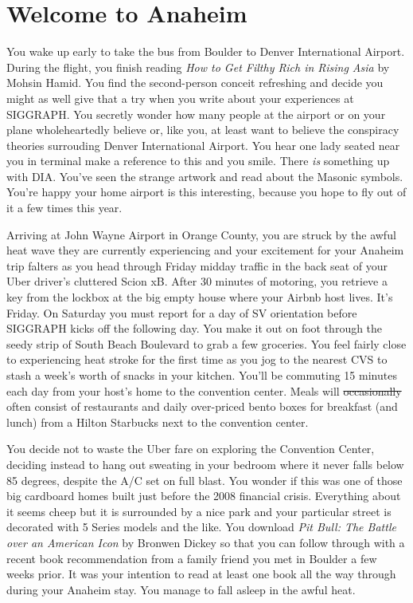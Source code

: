\documentclass[../main.tex]{subfiles}
\begin{document}
\section{Welcome to Anaheim}

You wake up early to take the bus from Boulder to Denver International Airport. During the flight, you finish reading \textit{How to Get Filthy Rich in Rising Asia} by Mohsin Hamid. You find the second-person conceit refreshing and decide you might as well give that a try when you write about your experiences at SIGGRAPH. You secretly wonder how many people at the airport or on your plane wholeheartedly believe or, like you, at least want to believe the conspiracy theories surrouding Denver International Airport. You hear one lady seated near you in terminal make a reference to this and you smile. There \textit{is} something up with DIA. You've seen the strange artwork and read about the Masonic symbols. You're happy your home airport is this interesting, because you hope to fly out of it a few times this year.

Arriving at John Wayne Airport in Orange County, you are struck by the awful heat wave they are currently experiencing and your excitement for your Anaheim trip falters as you head through Friday midday traffic in the back seat of your Uber driver's cluttered Scion xB. After 30 minutes of motoring, you retrieve a key from the lockbox at the big empty house where your Airbnb host lives. It's Friday. On Saturday you must report for a day of SV orientation before SIGGRAPH kicks off the following day. You make it out on foot through the seedy strip of South Beach Boulevard to grab a few groceries. You feel fairly close to experiencing heat stroke for the first time as you jog to the nearest CVS to stash a week's worth of snacks in your kitchen. You'll be commuting 15 minutes each day from your host's home to the convention center. Meals will \sout{occasionally} often consist of restaurants and daily over-priced bento boxes for breakfast (and lunch) from a Hilton Starbucks next to the convention center.

You decide not to waste the Uber fare on exploring the Convention Center, deciding instead to hang out sweating in your bedroom where it never falls below 85 degrees, despite the A/C set on full blast. You wonder if this was one of those big cardboard homes built just before the 2008 financial crisis. Everything about it seems cheep but it is surrounded by a nice park and your particular street is decorated with 5 Series models and the like. You download \textit{Pit Bull: The Battle over an American Icon} by Bronwen Dickey so that you can follow through with a recent book recommendation from a family friend you met in Boulder a few weeks prior. It was your intention to read at least one book all the way through during your Anaheim stay. You manage to fall asleep in the awful heat.
 
\end{document}
